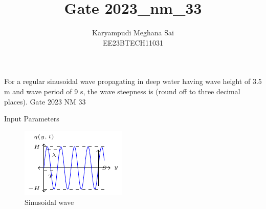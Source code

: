 \documentclass[journal,12pt,onecolumn]{IEEEtran}
\theoremstyle{remark}
\begin{document}
\let\vec\mathbf







\bigskip


\title{Gate 2023\_nm\_33}
\author{Karyampudi Meghana Sai\\ EE23BTECH11031}

\maketitle

For a regular sinusoidal wave propagating in deep water having wave height of 3.5 m and wave period of 9 s, the wave steepness is \underline{\hspace{1cm}} (round off to three decimal places).
\hfill Gate 2023 NM 33

\solution
\fi

\begin{table}[h]
 	\centering
 	\resizebox{6 cm}{!}{
 		
 	}
 	\vspace{6 pt}
 	\caption{Input Parameters}
 	\label{} 
 \end{table} 
 
 \begin{figure}[h!]
    \centering
    \includegraphics[width=\columnwidth]{figs/figs1.pdf}
    \caption{Sinusoidal wave}
    \label{fig:}
\end{figure} 
\end{document}
